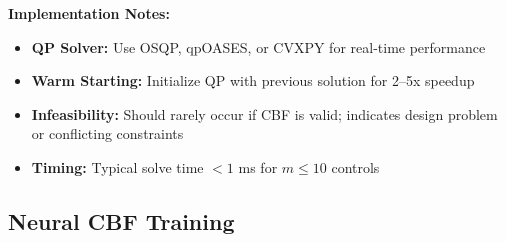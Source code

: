\textbf{Implementation Notes:}
\begin{itemize}
    \item \textbf{QP Solver:} Use OSQP, qpOASES, or CVXPY for real-time performance
    \item \textbf{Warm Starting:} Initialize QP with previous solution for 2--5x speedup
    \item \textbf{Infeasibility:} Should rarely occur if CBF is valid; indicates design problem or conflicting constraints
    \item \textbf{Timing:} Typical solve time $<1$ ms for $m \leq 10$ controls
\end{itemize}

\subsection{Neural CBF Training}
\label{subsec:alg_ncbf}

